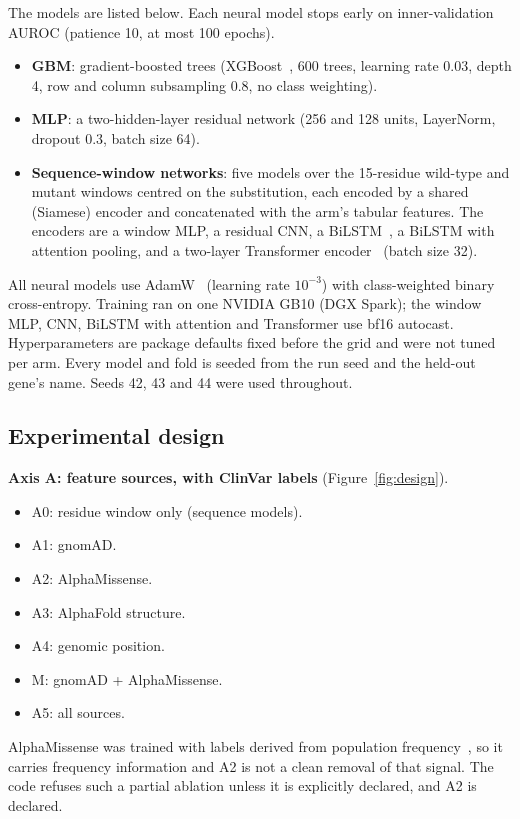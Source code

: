 \documentclass[11pt]{article}
\begin{document}
The models are listed below. Each neural model stops early on inner-validation AUROC
(patience 10, at most 100 epochs).
\begin{itemize}
\item \textbf{GBM}: gradient-boosted trees (XGBoost~\citep{chen2016xgboost}, 600 trees,
  learning rate 0.03, depth 4, row and column subsampling 0.8, no class weighting).
\item \textbf{MLP}: a two-hidden-layer residual network (256 and 128 units, LayerNorm,
  dropout 0.3, batch size 64).
\item \textbf{Sequence-window networks}: five models over the 15-residue wild-type and
  mutant windows centred on the substitution, each encoded by a shared (Siamese) encoder
  and concatenated with the arm's tabular features. The encoders are a window MLP, a
  residual CNN, a BiLSTM~\citep{hochreiter1997lstm}, a BiLSTM with attention pooling, and
  a two-layer Transformer encoder~\citep{vaswani2017attention} (batch size 32).
\end{itemize}
All neural models use AdamW~\citep{loshchilov2019adamw} (learning rate $10^{-3}$) with
class-weighted binary cross-entropy. Training ran on one NVIDIA GB10 (DGX Spark); the window
MLP, CNN, BiLSTM with attention and Transformer use bf16 autocast. Hyperparameters are package defaults fixed before the grid and
were not tuned per arm. Every model and fold is seeded from the run seed and the held-out
gene's name. Seeds 42, 43 and 44 were used throughout.

\subsection{Experimental design}

\textbf{Axis A: feature sources, with ClinVar labels} (Figure~\ref{fig:design}).
\begin{itemize}
\item A0: residue window only (sequence models).
\item A1: gnomAD.
\item A2: AlphaMissense.
\item A3: AlphaFold structure.
\item A4: genomic position.
\item M: gnomAD + AlphaMissense.
\item A5: all sources.
\end{itemize}
AlphaMissense was trained with labels derived from population
frequency~\citep{cheng2023alphamissense}, so it carries frequency information and A2 is
not a clean removal of that signal. The code refuses such a partial ablation unless it is
explicitly declared, and A2 is declared.
\end{document}
